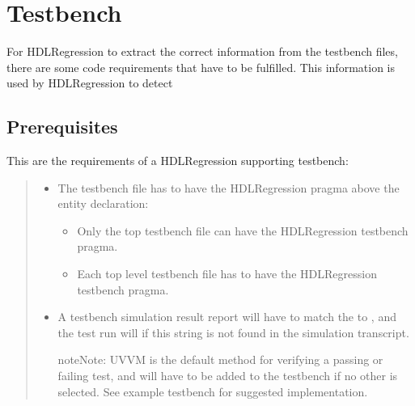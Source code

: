 \documentclass[letterpaper,10pt,english]{sphinxmanual}
\begin{document}
\chapter{Testbench}
\label{\detokenize{testbench:testbench}}\label{\detokenize{testbench::doc}}
\sphinxAtStartPar
For HDLRegression to extract the correct information from the testbench files, there are some
code requirements that have to be fulfilled. This information is used by HDLRegression to
detect


\section{Prerequisites}
\label{\detokenize{testbench:prerequisites}}
\sphinxAtStartPar
This are the requirements of a HDLRegression supporting testbench:
\begin{quote}
\begin{itemize}
\item {} 
\sphinxAtStartPar
The testbench file has to have the HDLRegression pragma above the entity declaration:
\begin{itemize}
\item {} 
\sphinxAtStartPar
Only the top testbench file can have the HDLRegression testbench pragma.

\item {} 
\sphinxAtStartPar
Each top level testbench file has to have the HDLRegression testbench pragma.

\end{itemize}

\item {} 
\sphinxAtStartPar
A testbench simulation result report will have to match the {\hyperref[\detokenize{api:set-result-check-string}]{}} to
, and the test run will  if this string is not found in the simulation transcript.

\begin{sphinxadmonition}{note}{Note:}
\sphinxAtStartPar
UVVM  is the default method for verifying a passing or failing test, and will have
to be added to the testbench if no other  is selected. See example testbench for suggested
implementation.
\end{sphinxadmonition}

\end{itemize}


\end{quote}
\end{document}
